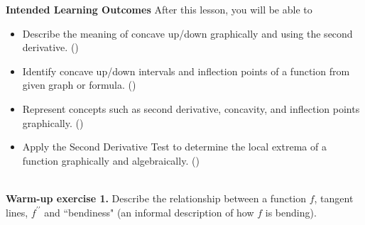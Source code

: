 \documentclass[10pt]{article}
\begin{document}
\pagestyle{otherpages}
\thispagestyle{firstpage}

\textbf{Intended Learning Outcomes}
After this lesson, you will be able to 

\begin{itemize}
    \item Describe the meaning of concave up/down graphically and using the second derivative. ()
    \item Identify concave up/down intervals and inflection points of a function from given graph or formula. ()
    \item Represent concepts such as second derivative, concavity, and inflection points graphically. ()
    \item Apply the Second Derivative Test to determine the local extrema of a function graphically and algebraically. ()
\end{itemize}

\vspace{-0.5cm}

\hrulefill\\

{\bf\color{blue} Warm-up exercise 1.} Describe the relationship between a function $f$, tangent lines, $f^{\prime\prime}$ and ``bendiness" (an informal description of how $f$ is bending).\\
\end{document}

